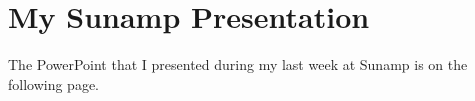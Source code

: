 
\chapter{My Sunamp Presentation} %

\label{App:Presentation} %


The PowerPoint that I presented during my last week at Sunamp is on the following page.

